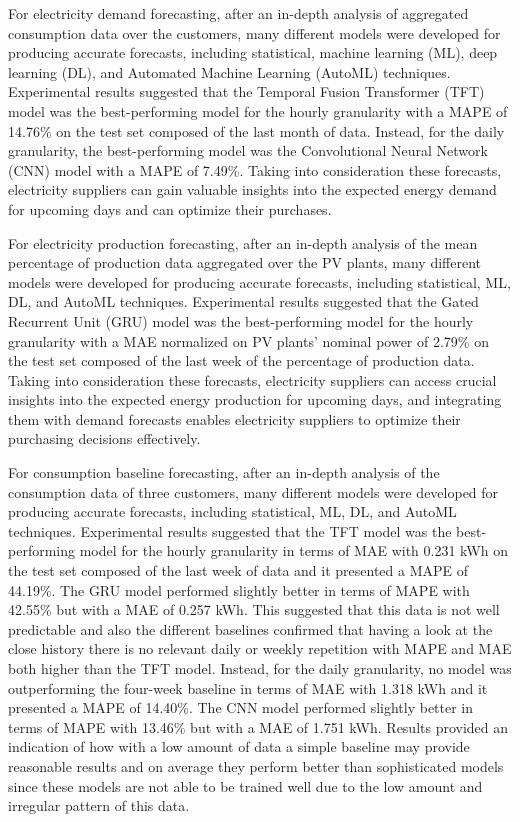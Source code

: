 For electricity demand forecasting, after an in-depth analysis of aggregated consumption data over the customers, many different models were developed for producing accurate forecasts, including statistical, machine learning (ML), deep learning (DL), and Automated Machine Learning (AutoML) techniques.
Experimental results suggested that the Temporal Fusion Transformer (TFT) model was the best-performing model for the hourly granularity with a MAPE of 14.76\% on the test set composed of the last month of data.
Instead, for the daily granularity, the best-performing model was the Convolutional Neural Network (CNN) model with a MAPE of 7.49\%.
Taking into consideration these forecasts, electricity suppliers can gain valuable insights into the expected energy demand for upcoming days and can optimize their purchases.

For electricity production forecasting, after an in-depth analysis of the mean percentage of production data aggregated over the PV plants, many different models were developed for producing accurate forecasts, including statistical, ML, DL, and AutoML techniques.
Experimental results suggested that the Gated Recurrent Unit (GRU) model was the best-performing model for the hourly granularity with a MAE normalized on PV plants' nominal power of 2.79\% on the test set composed of the last week of the percentage of production data.
Taking into consideration these forecasts, electricity suppliers can access crucial insights into the expected energy production for upcoming days, and integrating them with demand forecasts enables electricity suppliers to optimize their purchasing decisions effectively.

For consumption baseline forecasting, after an in-depth analysis of the consumption data of three customers, many different models were developed for producing accurate forecasts, including statistical, ML, DL, and AutoML techniques.
Experimental results suggested that the TFT model was the best-performing model for the hourly granularity in terms of MAE with 0.231 kWh on the test set composed of the last week of data and it presented a MAPE of 44.19\%.
The GRU model performed slightly better in terms of MAPE with 42.55\% but with a MAE of 0.257 kWh.
This suggested that this data is not well predictable and also the different baselines confirmed that having a look at the close history there is no relevant daily or weekly repetition with MAPE and MAE both higher than the TFT model.
Instead, for the daily granularity, no model was outperforming the four-week baseline in terms of MAE with 1.318 kWh and it presented a MAPE of 14.40\%.
The CNN model performed slightly better in terms of MAPE with 13.46\% but with a MAE of 1.751 kWh.
Results provided an indication of how with a low amount of data a simple baseline may provide reasonable results and on average they perform better than sophisticated models since these models are not able to be trained well due to the low amount and irregular pattern of this data.

